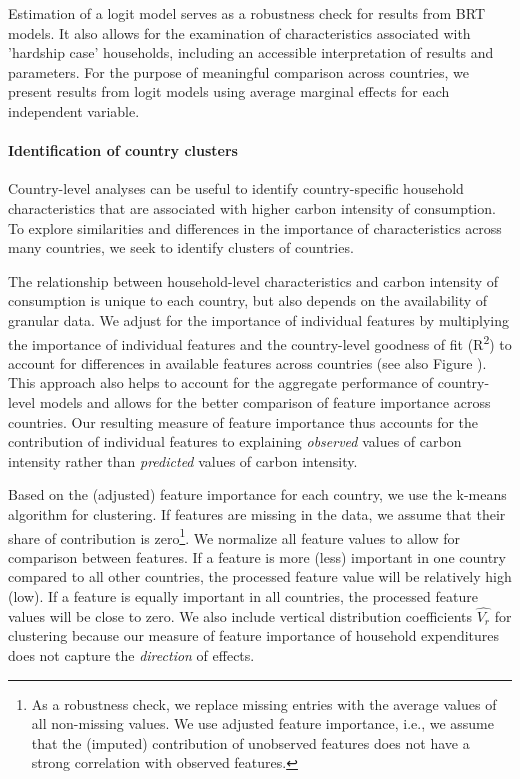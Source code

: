 \documentclass[12pt, a4paper]{article}
\begin{document}
Estimation of a logit model serves as a robustness check for results from BRT models. It also allows for the examination of characteristics associated with 'hardship case' households, including an accessible interpretation of results and parameters. For the purpose of meaningful comparison across countries, we present results from logit models using average marginal effects for each independent variable.

\paragraph{Identification of country clusters} Country-level analyses can be useful to identify country-specific household characteristics that are associated with higher carbon intensity of consumption. To explore similarities and differences in the importance of characteristics across many countries, we seek to identify clusters of countries. 

The relationship between household-level characteristics and carbon intensity of consumption is unique to each country, but also depends on the availability of granular data. We adjust for the importance of individual features by multiplying the importance of individual features and the country-level goodness of fit (R\textsuperscript{2}) to account for differences in available features across countries (see also Figure ). This approach also helps to account for the aggregate performance of country-level models and allows for the better comparison of feature importance across countries. Our resulting measure of feature importance thus accounts for the contribution of individual features to explaining \textit{observed} values of carbon intensity rather than \textit{predicted} values of carbon intensity.

Based on the (adjusted) feature importance for each country, we use the k-means algorithm for clustering. If features are missing in the data, we assume that their share of contribution is zero\footnote{As a robustness check, we replace missing entries with the average values of all non-missing values. We use adjusted feature importance, i.e., we assume that the (imputed) contribution of unobserved features does not have a strong correlation with observed features.}. We normalize all feature values to allow for comparison between features. If a feature is more (less) important in one country compared to all other countries, the processed feature value will be relatively high (low). If a feature is equally important in all countries, the processed feature values will be close to zero. We also include vertical distribution coefficients $\widehat{V_{r}}$ for clustering because our measure of feature importance of household expenditures does not capture the \textit{direction} of effects.
\end{document}
